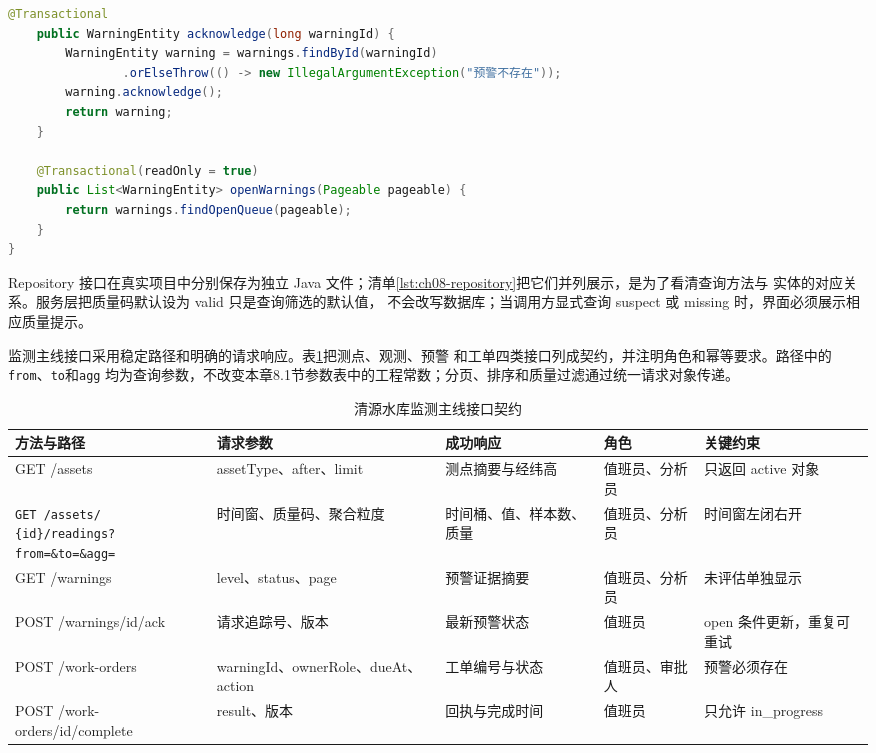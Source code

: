 \begin{lstlisting}[label={lst:ch08-service},language=Java,caption={监测主线事务服务}]
    @Transactional
    public WarningEntity acknowledge(long warningId) {
        WarningEntity warning = warnings.findById(warningId)
                .orElseThrow(() -> new IllegalArgumentException("预警不存在"));
        warning.acknowledge();
        return warning;
    }

    @Transactional(readOnly = true)
    public List<WarningEntity> openWarnings(Pageable pageable) {
        return warnings.findOpenQueue(pageable);
    }
}
\end{lstlisting}

Repository 接口在真实项目中分别保存为独立 Java 文件；清单\ref{lst:ch08-repository}把它们并列展示，是为了看清查询方法与
实体的对应关系。服务层把质量码默认设为 valid 只是查询筛选的默认值，
不会改写数据库；当调用方显式查询 suspect 或 missing 时，界面必须展示相应质量提示。

监测主线接口采用稳定路径和明确的请求响应。表\ref{tab:monitoring-api-contract}把测点、观测、预警
和工单四类接口列成契约，并注明角色和幂等要求。路径中的\texttt{from}、\texttt{to}和\texttt{agg}
均为查询参数，不改变本章8.1节参数表中的工程常数；分页、排序和质量过滤通过统一请求对象传递。

\begin{table}[htbp]
\centering
\scriptsize
\setlength{\tabcolsep}{3pt}
\caption{清源水库监测主线接口契约}
\label{tab:monitoring-api-contract}
\begin{tabular}{p{2.8cm}p{2.7cm}p{3.5cm}p{2.3cm}p{2.5cm}}
\toprule
方法与路径 & 请求参数 & 成功响应 & 角色 & 关键约束 \\
\midrule
GET /assets & assetType、after、limit & 测点摘要与经纬高 & 值班员、分析员 & 只返回 active 对象 \\
\shortstack{\texttt{GET /assets/}\\
\texttt{\{id\}/readings?}\\
\texttt{from=\&to=\&agg=}} & 时间窗、质量码、聚合粒度 & 时间桶、值、样本数、质量 & 值班员、分析员 & 时间窗左闭右开 \\
GET /warnings & level、status、page & 预警证据摘要 & 值班员、分析员 & 未评估单独显示 \\
POST /warnings/{id}/ack & 请求追踪号、版本 & 最新预警状态 & 值班员 & open 条件更新，重复可重试 \\
POST /work-orders & warningId、ownerRole、dueAt、action & 工单编号与状态 & 值班员、审批人 & 预警必须存在 \\
POST /work-orders/{id}/complete & result、版本 & 回执与完成时间 & 值班员 & 只允许 in\_progress \\
\bottomrule
\end{tabular}
\end{table}

